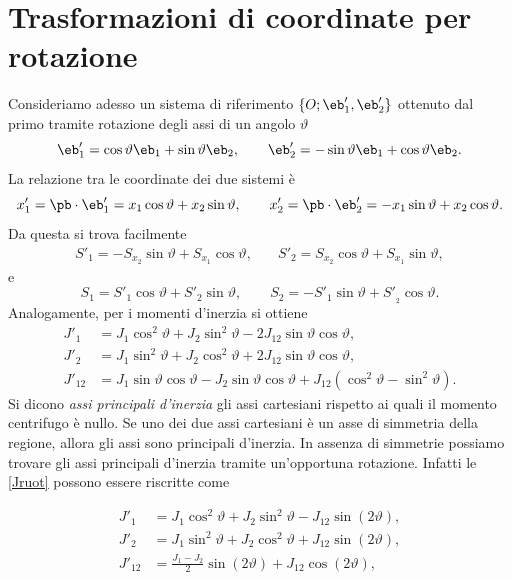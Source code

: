 \section{Trasformazioni di coordinate per rotazione}
Consideriamo adesso un sistema di riferimento $\{O; \eb_1', \eb_2'\}$ ottenuto dal primo tramite rotazione degli assi di un angolo $\vartheta$
\begin{equation}
\eb_1'=\cos\vartheta\eb_1+\sin\vartheta\eb_2, \qquad \eb_2'=-\sin\vartheta\eb_1+\cos\vartheta\eb_2.
\end{equation}
La relazione tra le coordinate dei due sistemi è
\begin{equation}
x_1'=\pb\cdot \eb_1'=x_1\cos\vartheta+x_2\sin\vartheta, \qquad x_2'=\pb\cdot \eb_2'=-x_1\sin\vartheta+x_2\cos\vartheta.
\end{equation}
Da questa si trova facilmente
\begin{equation}
	\begin{aligned}S'_{1}=-S_{x_2}\sin\vartheta+S_{x_1}\cos\vartheta,\quad&S'_{2}=S_{x_2}\cos\vartheta+S_{x_1}\sin\vartheta,\end{aligned}
\end{equation}
e
\begin{equation}
	S_{1}=S'_{1}\left.\cos\vartheta+S'_{2}\sin\vartheta,\quad\right.\quad S_{2}=-S'_{1}\sin\vartheta+S'_{_2}\cos\vartheta.
\end{equation}
Analogamente, per i momenti d'inerzia si ottiene
\begin{equation}\label{Jruot}
	\begin{aligned}
		J'_{1}& =J_1\cos^2\vartheta+J_2\sin^2\vartheta-2J_{12}\sin\vartheta\cos\vartheta, \\
		J'_{2}& =J_1\sin^2\vartheta+J_2\cos^2\vartheta+2J_{12}\sin\vartheta\cos\vartheta, \\
		J'_{12}& =J_1\sin\vartheta\cos\vartheta-J_2\sin\vartheta\cos\vartheta+J_{12}(\cos^2\vartheta-\sin^2\vartheta). 
	\end{aligned}
\end{equation}
Si dicono \textit{assi principali d’inerzia} gli assi cartesiani rispetto ai quali il momento centrifugo è nullo. Se uno dei due assi cartesiani è un asse di simmetria della regione, allora gli assi sono principali d’inerzia. In assenza di simmetrie possiamo trovare gli assi principali d’inerzia tramite un’opportuna rotazione. Infatti le \eqref{Jruot} possono essere riscritte come
\begin{definition}
	\begin{equation}\label{Jp}
	\begin{aligned}
		J'_{1}& =J_{1}\cos^{2}\vartheta+J_{2}\sin^{2}\vartheta-J_{12}\sin(2\vartheta), \\
		J'_{2}& =J_1\sin^2\vartheta+J_2\cos^2\vartheta+J_{12}\sin(2\vartheta), \\
		J'_{12}& =\frac{J_1-J_2}2\sin(2\vartheta)+J_{12}\cos(2\vartheta),
	\end{aligned}
\end{equation}
\end{definition}
